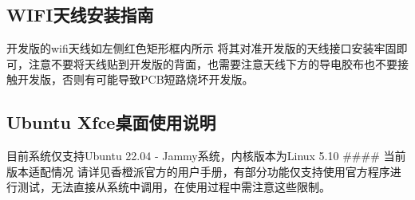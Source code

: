 
\subsection{WIFI天线安装指南}\label{wifiux5929ux7ebfux5b89ux88c5ux6307ux5357}

开发版的wifi天线如左侧红色矩形框内所示
将其对准开发版的天线接口安装牢固即可，注意不要将天线贴到开发版的背面，也需要注意天线下方的导电胶布也不要接触开发版，否则有可能导致PCB短路烧坏开发版。

\subsection{Ubuntu
Xfce桌面使用说明}\label{ubuntu-xfceux684cux9762ux4f7fux7528ux8bf4ux660e}

目前系统仅支持Ubuntu 22.04 - Jammy系统，内核版本为Linux 5.10 \#\#\#\#
当前版本适配情况
请详见香橙派官方的用户手册，有部分功能仅支持使用官方程序进行测试，无法直接从系统中调用，在使用过程中需注意这些限制。

